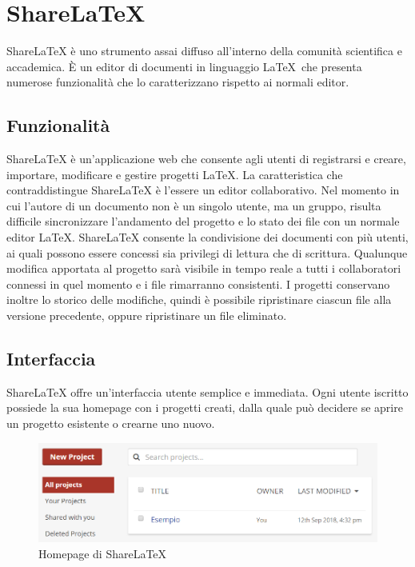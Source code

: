 \chapter{ShareLaTeX}
\label{ShareLaTeX}
\thispagestyle{empty}

ShareLaTeX è uno strumento assai diffuso all'interno della comunità scientifica e accademica. È un editor di documenti in linguaggio \LaTeX ~che presenta numerose funzionalità che lo caratterizzano rispetto ai normali editor.

\section{Funzionalità}

ShareLaTeX è un'applicazione web che consente agli utenti di registrarsi e creare, importare, modificare e gestire progetti \LaTeX. La caratteristica che contraddistingue ShareLaTeX è l'essere un editor collaborativo. Nel momento in cui l'autore di un documento non è un singolo utente, ma un gruppo, risulta difficile sincronizzare l'andamento del progetto e lo stato dei file con un normale editor \LaTeX. ShareLaTeX consente la condivisione dei documenti con più utenti, ai quali possono essere concessi sia privilegi di lettura che di scrittura. Qualunque modifica apportata al progetto sarà visibile in tempo reale a tutti i collaboratori connessi in quel momento e i file rimarranno consistenti. I progetti conservano inoltre lo storico delle modifiche, quindi è possibile ripristinare ciascun file alla versione precedente, oppure ripristinare un file eliminato.

\section{Interfaccia}
ShareLaTeX offre un'interfaccia utente semplice e immediata. Ogni utente iscritto possiede la sua homepage con i progetti creati, dalla quale può decidere se aprire un progetto esistente o crearne uno nuovo.
\begin{figure}[h]
    \centering
    \includegraphics[scale=0.7]{immagini/homepage.PNG}
    \caption{Homepage di ShareLaTeX}
    \label{fig:sharelatex_homepage}
\end{figure}

